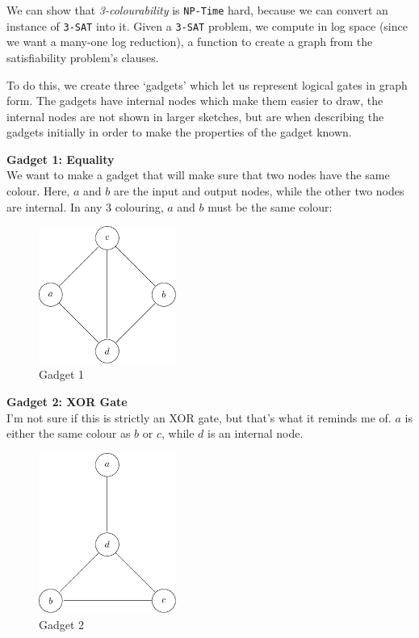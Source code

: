 We can show that \textit{3-colourability} is \texttt{NP-Time} hard, because we
can convert an instance of \texttt{3-SAT} into it. Given a \texttt{3-SAT}
problem, we compute in log space (since we want a many-one log reduction), a
function to create a graph from the satisfiability problem's clauses.

To do this, we create three `gadgets' which let us represent logical gates in
graph form. The gadgets have internal nodes which make them easier to draw, the
internal nodes are not shown in larger sketches, but are when describing the
gadgets initially in order to make the properties of the gadget known.

\begin{description}
  \item \textbf{Gadget 1: Equality}\\
    We want to make a gadget that will make sure that two nodes have the same 
    colour. Here, $a$ and $b$ are the input and output nodes, while the other 
    two nodes are internal. In any $3$ colouring, $a$ and $b$ must be the same  
    colour:

    \begin{figure}[H]
      \centering
      \includegraphics[width=0.4\textwidth]{diagrams/graph11}
      \caption{Gadget 1}
      \label{fig:gadget1}
    \end{figure}

  \item \textbf{Gadget 2: XOR Gate}\\
    I'm not sure if this is strictly an XOR gate, but that's what it reminds me 
    of. $a$ is either the same colour as $b$ or $c$, while $d$ is an internal 
    node.

    \begin{figure}[H]
      \centering
      \includegraphics[width=0.4\textwidth]{diagrams/graph12}
      \caption{Gadget 2}
      \label{fig:gadget2}
    \end{figure}


\end{description}
